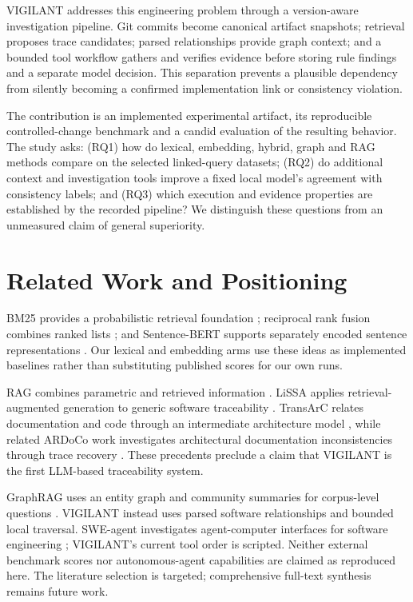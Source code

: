 \documentclass[conference,a4paper]{IEEEtran}
\begin{document}
VIGILANT addresses this engineering problem through a version-aware investigation pipeline. Git commits become canonical artifact snapshots; retrieval proposes trace candidates; parsed relationships provide graph context; and a bounded tool workflow gathers and verifies evidence before storing rule findings and a separate model decision. This separation prevents a plausible dependency from silently becoming a confirmed implementation link or consistency violation.

The contribution is an implemented experimental artifact, its reproducible controlled-change benchmark and a candid evaluation of the resulting behavior. The study asks: (RQ1) how do lexical, embedding, hybrid, graph and RAG methods compare on the selected linked-query datasets; (RQ2) do additional context and investigation tools improve a fixed local model's agreement with consistency labels; and (RQ3) which execution and evidence properties are established by the recorded pipeline? We distinguish these questions from an unmeasured claim of general superiority.

\section{Related Work and Positioning}
BM25 provides a probabilistic retrieval foundation \cite{bm25}; reciprocal rank fusion combines ranked lists \cite{rrf}; and Sentence-BERT supports separately encoded sentence representations \cite{sbert}. Our lexical and embedding arms use these ideas as implemented baselines rather than substituting published scores for our own runs.

RAG combines parametric and retrieved information \cite{rag}. LiSSA applies retrieval-augmented generation to generic software traceability \cite{lissa}. TransArC relates documentation and code through an intermediate architecture model \cite{transarc}, while related ARDoCo work investigates architectural documentation inconsistencies through trace recovery \cite{ardoco}. These precedents preclude a claim that VIGILANT is the first LLM-based traceability system.

GraphRAG uses an entity graph and community summaries for corpus-level questions \cite{graphrag}. VIGILANT instead uses parsed software relationships and bounded local traversal. SWE-agent investigates agent-computer interfaces for software engineering \cite{sweagent}; VIGILANT's current tool order is scripted. Neither external benchmark scores nor autonomous-agent capabilities are claimed as reproduced here. The literature selection is targeted; comprehensive full-text synthesis remains future work.
\end{document}
